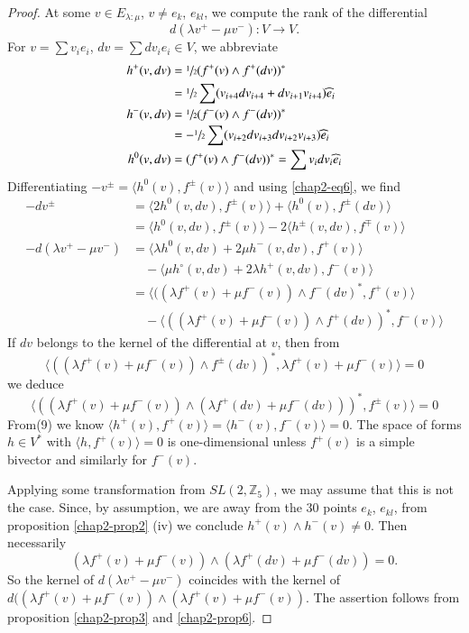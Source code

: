 \begin{proof}
At some $v\in E_{\lambda:\mu}$, $v\neq e_{k}$, $e_{kl}$, we compute
the rank of the differential
$$
d(\lambda v^{+}-\mu v^{-}):V\to V.
$$
For $v=\sum v_{i}e_{i}$, $dv=\sum dv_{i}e_{i}\in V$, we abbreviate
\begin{align*}
h^{+}(v,dv) &= \sfrac{1}{2}(f^{+}(v)\wedge f^{+}(dv))^{*}\\
&= \sfrac{1}{2}\sum (v_{i+4}dv_{i+4}+dv_{i+1}v_{i+4})\widehat{e}_{i}\\
h^{-}(v,dv) &=\sfrac{1}{2}(f^{-}(v)\wedge f^{-}(dv))^{*}\\
&= -\sfrac{1}{2}\sum (v_{i+2}dv_{i+3}dv_{i+2}v_{i+3})\widehat{e}_{i}\\
h^{0}(v,dv) &= (f^{+}(v)\wedge f^{-}(dv))^{*}=\sum v_{i}dv_{i}\widehat{e}_{i}
\end{align*}\pageoriginale
Differentiating $-v^{\pm}=\langle h^{0}(v), f^{\pm}(v)\rangle$ and
using \eqref{chap2-eq6}, we find
\begin{align*}
-dv^{\pm} &= \langle 2h^{0}(v,dv),f^{\pm}(v)\rangle +\langle h^{0}(v),
 f^{\pm}(dv)\rangle\\
&= \langle h^{0}(v,dv),f^{\pm}(v)\rangle -2\langle
 h^{\pm}(v,dv),f^{\mp}(v)\rangle\\
-d(\lambda v^{+}-\mu v^{-}) &= \langle \lambda h^{0}(v,dv)+2\mu
 h^{-}(v,dv),f^{+}(v)\rangle\\
&\quad -\langle \mu h^{\circ}(v,dv)+2\lambda
 h^{+}(v,dv),f^{-}(v)\rangle\\
&= \langle ((\lambda f^{+}(v)+\mu f^{-}(v))\wedge
 f^{-}(dv)^{*},f^{+}(v)\rangle\\
&\quad -\langle ((\lambda f^{+}(v)+\mu f^{-}(v))\wedge
 f^{+}(dv))^{*},f^{-}(v)\rangle 
\end{align*}
If $dv$ belongs to the kernel of the differential at $v$, then from
\begin{equation*}
\langle ((\lambda f^{+}(v)+\mu f^{-}(v))\wedge
f^{\pm}(dv))^{*}, \lambda f^{+}(v)+\mu f^{-}(v)\rangle =0\tag{6}
\end{equation*}
we deduce
$$
\langle ((\lambda f^{+}(v)+\mu f^{-}(v))\wedge (\lambda f^{+}(dv)+\mu
f^{-}(dv)))^{*}, f^{\pm}(v)\rangle =0 
$$
From\pageoriginale (9) we know $\langle
h^{+}(v),f^{+}(v)\rangle =\langle h^{-}(v), f^{-}(v)\rangle=0$. The
space of forms $h\in V^{*}$ with $\langle h, f^{+}(v)\rangle=0$ is
one-dimensional unless $f^{+}(v)$ is a simple bivector and similarly
for $f^{-}(v)$.

Applying some transformation from $SL(2,\mathbb{Z}_{5})$, we may
assume that this is not the case. Since, by assumption, we are away
from the 30 points $e_{k}$, $e_{kl}$, from
proposition \ref{chap2-prop2} (iv) we conclude $h^{+}(v)\wedge
h^{-}(v)\neq 0$. Then necessarily
$$
(\lambda f^{+}(v)+\mu f^{-}(v))\wedge (\lambda f^{+}(dv)+\mu
f^{-}(dv))=0. 
$$
So the kernel of $d(\lambda v^{+}-\mu v^{-})$ coincides with the
kernel of $d((\lambda f^{+}(v)+\mu f^{-}(v))\wedge (\lambda
f^{+}(v)+\mu f^{-}(v))$. The assertion follows from
proposition \ref{chap2-prop3} and \ref{chap2-prop6}.
\end{proof}

